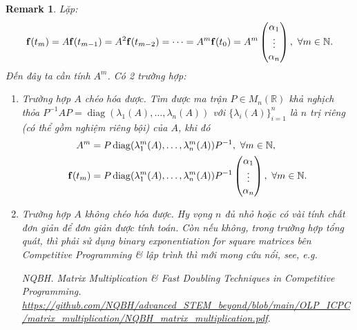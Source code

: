 \documentclass{article}
\newtheorem{remark}{Remark}
\begin{document}
\begin{remark}
	Lặp:
	\begin{equation*}
		{\bf f}(t_m) = A{\bf f}(t_{m-1}) = A^2{\bf f}(t_{m-2}) = \cdots = A^m{\bf f}(t_0) = A^m\begin{pmatrix}
			\alpha_1\\\vdots\\\alpha_n
		\end{pmatrix},\ \forall m\in\mathbb{N}.
	\end{equation*}
	Đến đây ta cần tính $A^m$. Có 2 trường hợp:
	\begin{enumerate}
		\item {\sf Trường hợp $A$ chéo hóa được.} Tìm được ma trận $P\in M_n(\mathbb{R})$ khả nghịch thỏa $P^{-1}AP = \operatorname{diag}(\lambda_1(A),\ldots,\lambda_n(A))$ với $\{\lambda_i(A)\}_{i=1}^n$ là $n$ trị riêng (có thể gồm nghiệm riêng bội) của $A$, khi đó
		\begin{align*}
			A^m &= P\operatorname{diag}(\lambda_1^m(A),\ldots,\lambda_n^m(A))P^{-1},\ \forall m\in\mathbb{N},\\
			{\bf f}(t_m) &= P\operatorname{diag}(\lambda_1^m(A),\ldots,\lambda_n^m(A))P^{-1}\begin{pmatrix}
				\alpha_1\\\vdots\\\alpha_n
			\end{pmatrix},\ \forall m\in\mathbb{N}.
		\end{align*}
		\item {\sf Trường hợp $A$ không chéo hóa được.} Hy vọng $n$ đủ nhỏ hoặc có vài tính chất đơn giản để đơn giản được tính toán. Còn nếu không, trong trường hợp tổng quát, thì phải sử dụng binary exponentiation for square matrices bên Competitive Programming \& lập trình thì mới mong cứu nổi, see, e.g.
		
		NQBH. {\it Matrix Multiplication \& Fast Doubling Techniques in Competitive Programming}. \url{https://github.com/NQBH/advanced_STEM_beyond/blob/main/OLP_ICPC/matrix_multiplication/NQBH_matrix_multiplication.pdf}.
	\end{enumerate}	
\end{remark}
\end{document}
